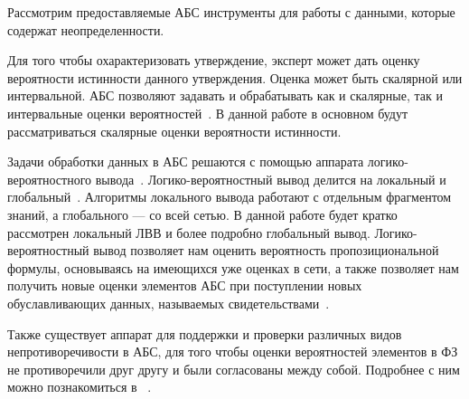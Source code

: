 Рассмотрим предоставляемые АБС инструменты для работы с данными, которые содержат неопределенности.

Для того чтобы охарактеризовать утверждение, эксперт может дать оценку вероятности истинности данного утверждения. Оценка может быть скалярной или интервальной. АБС позволяют задавать и обрабатывать как и скалярные, так и интервальные оценки вероятностей~\cite{184}. В данной работе в основном будут рассматриваться скалярные оценки вероятности истинности.

Задачи обработки данных в АБС решаются с помощью аппарата логико-вероятностного вывода~\cite{121}. Логико-вероятностный вывод делится на локальный и глобальный~\cite{51, 93}. Алгоритмы локального вывода работают с отдельным фрагментом знаний, а глобального --- со всей сетью. В данной работе будет кратко рассмотрен локальный ЛВВ и более подробно глобальный вывод. Логико-вероятностный вывод позволяет нам оценить вероятность пропозициональной формулы, основываясь на имеющихся уже оценках в сети, а также позволяет нам получить новые оценки элементов АБС при поступлении новых обуславливающих данных, называемых свидетельствами~\cite{84, 284}.
 
 Также существует аппарат для поддержки и проверки различных видов непротиворечивости в АБС, для того чтобы оценки вероятностей элементов в ФЗ не противоречили друг другу и были согласованы между собой. Подробнее с ним можно познакомиться в ~\cite{184, 121}.
 
